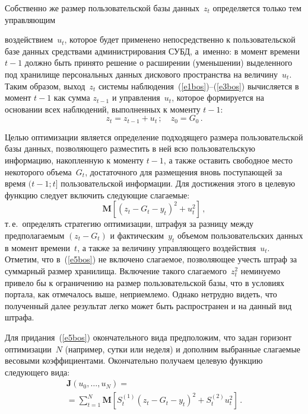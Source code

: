 \begin{multicols}{2}
  Собственно же размер пользовательской базы данных~$z_t$ определяется только тем 
управляющим\linebreak\vspace*{-12pt}
\columnbreak

\noindent
 воздействием~$u_t$, которое будет применено непосредственно к 
пользовательской базе данных средствами администрирования СУБД, а~именно: в момент 
времени $t-1$ должно быть принято решение о расширении (уменьшении) выделенного под 
хранилище персональных данных дискового пространства на величину~$u_t$. Таким 
образом, выход~$z_t$ системы наблюдения~(\ref{e1bos})--(\ref{e3bos}) вычисляется в 
момент $t-1$ как сумма $z_{t-1}$ и управления~$u_t$, которое формируется на основании 
всех наблюдений, выполненных к моменту $t-1$:
  \begin{equation}
  z_t=z_{t-1}+u_t\,;\quad z_0=G_0\,.
  \label{e4bos}
  \end{equation}
  
  Целью оптимизации является определение подходящего размера пользовательской базы 
данных, позволяющего разместить в ней всю пользовательскую информацию, накопленную 
к моменту $t-1$, а также оставить свободное место некоторого объема~$G_t$, достаточного 
для размещения вновь поступающей за время $(t-1;t]$ пользовательской информации. Для 
достижения этого в целевую функцию следует включить следующие слагаемые:
  \begin{equation}
  \mathbf{M}\left[\left( z_t-G_t-y_t\right)^2+u_t^2\right]\,,
  \label{e5bos}
  \end{equation}
т.\,е.\ определять стратегию оптимизации, штрафуя за разницу между предполагаемым $(z_t-
G_t)$ и фактическим~$y_t$ объемом пользовательских данных в момент времени~$t$, а 
также за величину управ\-ля\-юще\-го воздействия~$u_t$. Отметим, что в~(\ref{e5bos}) не 
включено слагаемое, позволяющее учесть штраф за суммарный размер хранилища. 
Включение такого сла\-га\-емо\-го~$z_t^2$ неминуемо привело бы к ограничению на размер 
пользовательской базы, что в условиях портала, как отмечалось выше, неприемлемо. Однако 
нетрудно видеть, что полученный далее результат легко может быть распространен и на 
данный вид штрафа.
  
  Для придания~(\ref{e5bos}) окончательного вида предположим, что задан горизонт 
оптимизации~$N$ (например, сутки или неделя) и дополним выбранные слагаемые 
весовыми коэффициентами. Окончательно получаем целевую функцию следующего вида:
  \begin{multline}
  \mathbf{J}\left(u_0, \ldots , u_N\right) ={}\\
  {}=\sum\limits_{t=1}^N \mathbf{M}\left[ 
  S_t^{(1)}\left( z_t-G_t-y_t\right)^2+S_t^{(2)} u_t^2\right]\,.
  \label{e6bos}
  \end{multline}


\end{multicols}
